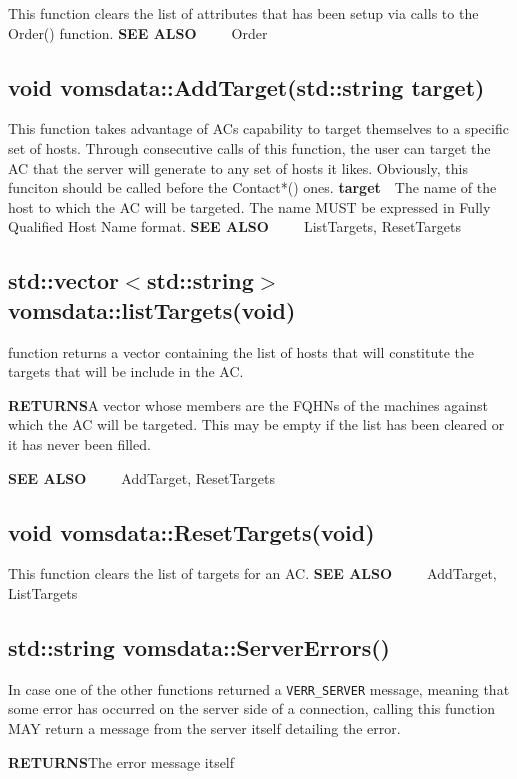 \documentclass[a4paper]{book}
\newcommand{\also}[1]{\textbf{SEE ALSO}\newline\ \ \ \ \ #1}
\newcommand{\return}{\textbf{RETURNS}\newline}
\newcommand{\parameter}[2]{\newline\textbf{#1}\ \ #2}
\begin{document}
This function clears the list of attributes that has been setup via
calls to the Order() function.
\also{Order}

\subsection{void vomsdata::AddTarget(std::string target)}

This function takes advantage of ACs capability to target themselves
to a specific set of hosts.  Through consecutive calls of this
function, the user can target the AC that the server will generate to
any set of hosts it likes.  Obviously, this funciton should be called
before the Contact*() ones.
\parameter{target}{The name of the host to which the AC will be targeted.  The name MUST be expressed in Fully Qualified Host Name format.}
\also{ListTargets, ResetTargets}

\subsection{std::vector$<$std::string$>$ vomsdata::listTargets(void)}

function returns a vector containing the list of hosts that will
constitute the targets that will be include in the AC.

\return A vector whose members are the FQHNs of the machines against
which the AC will be targeted.  This may be empty if the list has been
cleared or it has never been filled.

\also{AddTarget, ResetTargets}

\subsection{void vomsdata::ResetTargets(void)}

This function clears the list of targets for an AC.
\also{AddTarget, ListTargets}

\subsection{std::string vomsdata::ServerErrors()}

In case one of the other functions returned a \texttt{VERR\_SERVER}
message, meaning that some error has occurred on the server side of a
connection, calling this function MAY return a message from the server
itself detailing the error.

\return The error message itself
\end{document}
